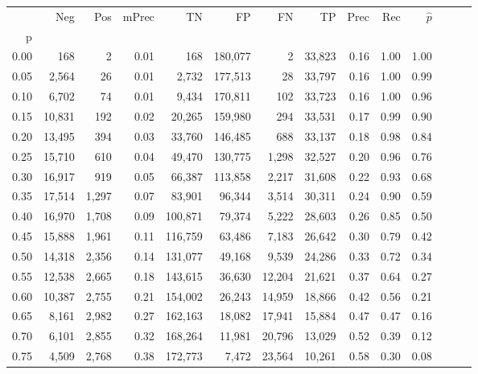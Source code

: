 \begin{tabular}{rrrrrrrrrrrrrr}
\toprule
{} &     Neg &    Pos & mPrec &       TN &       FP &      FN &      TP &  Prec &   Rec & $\hat{p}$ \\
p    &         &        &       &          &          &         &         &       &       &           \\
\midrule
0.00 &     168 &      2 &  0.01 &      168 &  180,077 &       2 &  33,823 &  0.16 &  1.00 &      1.00 \\
0.05 &   2,564 &     26 &  0.01 &    2,732 &  177,513 &      28 &  33,797 &  0.16 &  1.00 &      0.99 \\
0.10 &   6,702 &     74 &  0.01 &    9,434 &  170,811 &     102 &  33,723 &  0.16 &  1.00 &      0.96 \\
0.15 &  10,831 &    192 &  0.02 &   20,265 &  159,980 &     294 &  33,531 &  0.17 &  0.99 &      0.90 \\
0.20 &  13,495 &    394 &  0.03 &   33,760 &  146,485 &     688 &  33,137 &  0.18 &  0.98 &      0.84 \\
0.25 &  15,710 &    610 &  0.04 &   49,470 &  130,775 &   1,298 &  32,527 &  0.20 &  0.96 &      0.76 \\
0.30 &  16,917 &    919 &  0.05 &   66,387 &  113,858 &   2,217 &  31,608 &  0.22 &  0.93 &      0.68 \\
0.35 &  17,514 &  1,297 &  0.07 &   83,901 &   96,344 &   3,514 &  30,311 &  0.24 &  0.90 &      0.59 \\
0.40 &  16,970 &  1,708 &  0.09 &  100,871 &   79,374 &   5,222 &  28,603 &  0.26 &  0.85 &      0.50 \\
0.45 &  15,888 &  1,961 &  0.11 &  116,759 &   63,486 &   7,183 &  26,642 &  0.30 &  0.79 &      0.42 \\
0.50 &  14,318 &  2,356 &  0.14 &  131,077 &   49,168 &   9,539 &  24,286 &  0.33 &  0.72 &      0.34 \\
0.55 &  12,538 &  2,665 &  0.18 &  143,615 &   36,630 &  12,204 &  21,621 &  0.37 &  0.64 &      0.27 \\
0.60 &  10,387 &  2,755 &  0.21 &  154,002 &   26,243 &  14,959 &  18,866 &  0.42 &  0.56 &      0.21 \\
0.65 &   8,161 &  2,982 &  0.27 &  162,163 &   18,082 &  17,941 &  15,884 &  0.47 &  0.47 &      0.16 \\
0.70 &   6,101 &  2,855 &  0.32 &  168,264 &   11,981 &  20,796 &  13,029 &  0.52 &  0.39 &      0.12 \\
0.75 &   4,509 &  2,768 &  0.38 &  172,773 &    7,472 &  23,564 &  10,261 &  0.58 &  0.30 &      0.08 \\

\end{tabular}

